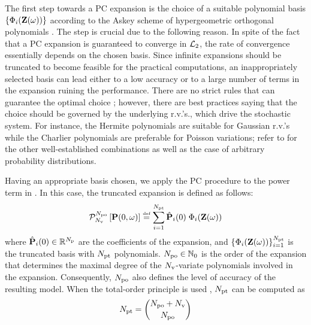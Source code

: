 The first step towards a PC expansion is the choice of a suitable polynomial basis $\{ \Phi_i(\mathbf{Z}(\omega)) \}$ according to the Askey scheme of hypergeometric orthogonal polynomials \cite{xiu2002}. The step is crucial due to the following reason. In spite of the fact that a PC expansion is guaranteed to converge in $\mathcal{L}_{2}$, the rate of convergence essentially depends on the chosen basis. Since infinite expansions should be truncated to become feasible for the practical computations, an inappropriately selected basis can lead either to a low accuracy or to a large number of terms in the expansion ruining the performance. There are no strict rules that can guarantee the optimal choice \cite{knio2006, maitre2010}; however, there are best practices saying that the choice should be governed by the underlying r.v.'s., which drive the stochastic system. For instance, the Hermite polynomials are suitable for Gaussian r.v.'s while the Charlier polynomials are preferable for Poisson variations; refer to \cite{xiu2002} for the other well-established combinations as well as the case of arbitrary probability distributions.

Having an appropriate basis chosen, we apply the PC procedure to the power term in . In this case, the truncated expansion is defined as follows:
\begin{equation} \elabel{pc-expansion}
  \oPC{\vars}{\pcorder}{\vP(0, \o)} \eqdef \sum_{i = 1}^{\pcterms} \pcc{\vP}_i(0) \; \pcb_i(\vZ(\o))
\end{equation}
where $\hat{\mathbf{P}}_i(0) \in \mathbb{R}^{N_\text{p}}$ are the coefficients of the expansion, and $\{ \Phi_i(\mathbf{Z}(\omega)) \}_{i = 1}^{{N_\text{pt}}}$ is the truncated basis with ${N_\text{pt}}$ polynomials. ${N_\text{po}} \in \mathbb{N}_{0}$ is the order of the expansion that determines the maximal degree of the ${N_\text{v}}$-variate polynomials involved in the expansion. Consequently, ${N_\text{po}}$ also defines the level of accuracy of the resulting model. When the total-order principle is used \cite{eldred2009}, ${N_\text{pt}}$ can be computed as
\begin{equation} \elabel{pc-terms}
  \pcterms = {\pcorder + \vars \choose \pcorder}
\end{equation}

